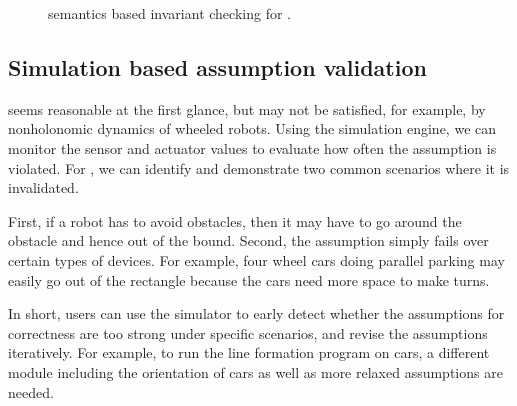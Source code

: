 \begin{figure}
\caption{\K semantics based invariant checking for \lgname.}
\label{fig:tools}
\end{figure}


\subsection{Simulation based assumption validation}

 seems reasonable at the first glance, but may not be satisfied, for example, by nonholonomic dynamics of wheeled robots. 
Using the simulation engine, we can monitor the sensor and actuator values to evaluate how often the assumption is violated.
For , we can identify and demonstrate two common scenarios
where it is invalidated.

First, if a robot has to avoid obstacles,
then it may have to go around the obstacle and hence out of the bound.
Second, the assumption simply fails over certain types of devices.
For example, four wheel cars doing parallel parking may easily go out of the rectangle
because the cars need more space to make turns.

In short, users can use the simulator to early detect whether
the assumptions for correctness are too strong under specific scenarios,
and revise the assumptions iteratively.
For example, to run the line formation program on cars,
a different module including the orientation of cars as well as more relaxed assumptions are needed.


